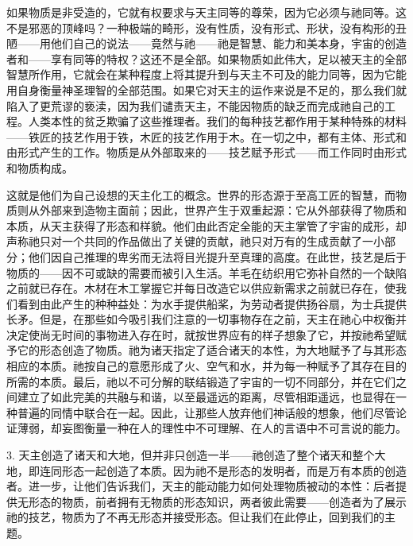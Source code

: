 如果物质是非受造的，它就有权要求与天主同等的尊荣，因为它必须与祂同等。这不是邪恶的顶峰吗？一种极端的畸形，没有性质，没有形式、形状，没有构形的丑陋——用他们自己的说法——竟然与祂——祂是智慧、能力和美本身，宇宙的创造者和——享有同等的特权？这还不是全部。如果物质如此伟大，足以被天主的全部智慧所作用，它就会在某种程度上将其提升到与天主不可及的能力同等，因为它能用自身衡量神圣理智的全部范围。如果它对天主的运作来说是不足的，那么我们就陷入了更荒谬的亵渎，因为我们谴责天主，不能因物质的缺乏而完成祂自己的工程。人类本性的贫乏欺骗了这些推理者。我们的每种技艺都作用于某种特殊的材料——铁匠的技艺作用于铁，木匠的技艺作用于木。在一切之中，都有主体、形式和由形式产生的工作。物质是从外部取来的——技艺赋予形式——而工作同时由形式和物质构成。\par

这就是他们为自己设想的天主化工的概念。世界的形态源于至高工匠的智慧，而物质则从外部来到造物主面前；因此，世界产生于双重起源：它从外部获得了物质和本质，从天主获得了形态和样貌。他们由此否定全能的天主掌管了宇宙的成形，却声称祂只对一个共同的作品做出了关键的贡献，祂只对万有的生成贡献了一小部分；他们因自己推理的卑劣而无法将目光提升至真理的高度。在此世，技艺是后于物质的——因不可或缺的需要而被引入生活。羊毛在纺织用它弥补自然的一个缺陷之前就已存在。木材在木工掌握它并每日改造它以供应新需求之前就已存在，使我们看到由此产生的种种益处：为水手提供船桨，为劳动者提供扬谷扇，为士兵提供长矛。但是，在那些如今吸引我们注意的一切事物存在之前，天主在祂心中权衡并决定使尚无时间的事物进入存在时，就按世界应有的样子想象了它，并按祂希望赋予它的形态创造了物质。祂为诸天指定了适合诸天的本性，为大地赋予了与其形态相应的本质。祂按自己的意愿形成了火、空气和水，并为每一种赋予了其存在目的所需的本质。最后，祂以不可分解的联结锻造了宇宙的一切不同部分，并在它们之间建立了如此完美的共融与和谐，以至最遥远的距离，尽管相距遥远，也显得在一种普遍的同情中联合在一起。因此，让那些人放弃他们神话般的想象，他们尽管论证薄弱，却妄图衡量一种在人的理性中不可理解、在人的言语中不可言说的能力。\par

3. 天主创造了诸天和大地，但并非只创造一半——祂创造了整个诸天和整个大地，即连同形态一起创造了本质。因为祂不是形态的发明者，而是万有本质的创造者。进一步，让他们告诉我们，天主的能动能力如何处理物质被动的本性：后者提供无形态的物质，前者拥有无物质的形态知识，两者彼此需要——创造者为了展示祂的技艺，物质为了不再无形态并接受形态。但让我们在此停止，回到我们的主题。\par

